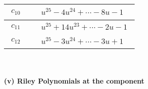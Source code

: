 \documentclass[1p]{elsarticle_modified}
\theoremstyle{definition}
\begin{document}
\begin{tabular}{m{50pt}|m{274pt}}
\hline $$\begin{aligned}c_{10}\end{aligned}$$&$\begin{aligned}
&u^{25}-4 u^{24}+\cdots-8 u-1
\end{aligned}$\\
\hline $$\begin{aligned}c_{11}\end{aligned}$$&$\begin{aligned}
&u^{25}+14 u^{23}+\cdots-2 u-1
\end{aligned}$\\
\hline $$\begin{aligned}c_{12}\end{aligned}$$&$\begin{aligned}
&u^{25}-3 u^{24}+\cdots-3 u+1
\end{aligned}$\\
\hline
\end{tabular}\\~\\
\newpage\renewcommand{\arraystretch}{1}
\flushleft \textbf{(v) Riley Polynomials at the component}\newline \\
\end{document}

